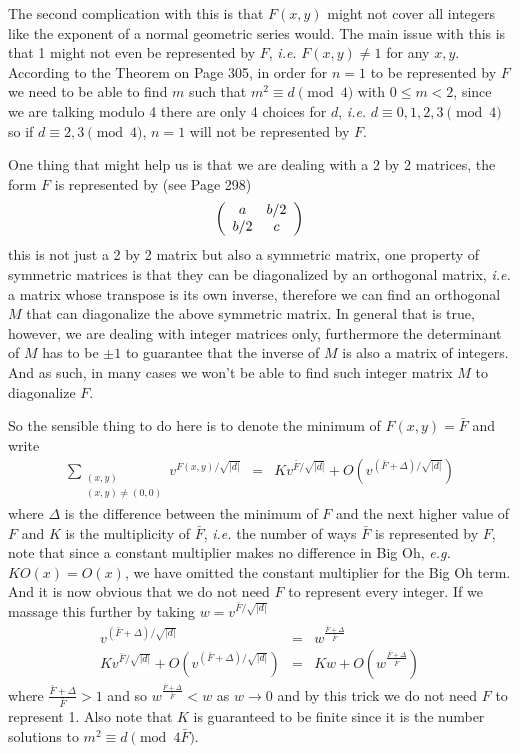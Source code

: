 \documentclass[aps,preprint,preprintnumbers,nofootinbib,showpacs,prd]{revtex4-1}
\newcommand{\ie}{{\it i.e.} }
\newcommand{\eg}{{\it e.g.} }
\newcommand{\nbea}{\begin{eqnarray*}}
\newcommand{\neea}{\end{eqnarray*}}
\begin{document}
The second complication with this is that $F(x,y)$ might not cover all integers like the exponent of a normal geometric series would. The main issue with this is that 1 might not even be represented by $F$, \ie $F(x,y) \neq 1$ for any $x,y$. According to the Theorem on Page 305, in order for $n=1$ to be represented by $F$ we need to be able to find $m$ such that $m^2 \equiv d \pmod{4}$ with $0 \le m < 2$, since we are talking modulo 4 there are only 4 choices for $d$, \ie $d \equiv 0,1,2,3 \pmod{4}$ so if $d \equiv 2,3 \pmod{4}$, $n=1$ will not be represented by $F$.

One thing that might help us is that we are dealing with a 2 by 2 matrices, the form $F$ is represented by (see Page 298)
%
\nbea
\left(
\begin{array}{c c}
a & b/2 \\
b/2 & c
\end{array}
\right)
\neea
%
this is not just a 2 by 2 matrix but also a symmetric matrix, one property of symmetric matrices is that they can be diagonalized by an orthogonal matrix, \ie a matrix whose transpose is its own inverse, therefore we can find an orthogonal $M$ that can diagonalize the above symmetric matrix. In general that is true, however, we are dealing with integer matrices only, furthermore the determinant of $M$ has to be $\pm1$ to guarantee that the inverse of $M$ is also a matrix of integers. And as such, in many cases we won't be able to find such integer matrix $M$ to diagonalize $F$.

So the sensible thing to do here is to denote the minimum of $F(x,y) = \bar F$ and write
%
\nbea
\sum_{\substack{(x,y)\\(x,y)\neq(0,0)}} v^{F(x,y)/\sqrt{|d|}} & = & Kv^{\bar F/\sqrt{|d|}} + O\left(v^{(\bar F + \Delta)/\sqrt{|d|}}\right)
\neea
%
where $\Delta$ is the difference between the minimum of $F$ and the next higher value of $F$ and $K$ is the multiplicity of $\bar F$, \ie the number of ways $\bar F$ is represented by $F$, note that since a constant multiplier makes no difference in Big Oh, \eg $K O(x) = O(x)$, we have omitted the constant multiplier for the Big Oh term. And it is now obvious that we do not need $F$ to represent every integer. If we massage this further by taking $w = v^{\bar F/\sqrt{|d|}}$
%
\nbea
v^{(\bar F+ \Delta)/\sqrt{|d|}} & = & w^{\frac{\bar F + \Delta}{\bar F}} \\
Kv^{\bar F/\sqrt{|d|}} + O\left(v^{(\bar F + \Delta)/\sqrt{|d|}} \right) & = & Kw + O\left(w^{\frac{\bar F + \Delta}{\bar F}}\right)
\neea
%
where $\frac{\bar F + \Delta}{\bar F} > 1$ and so $w^{\frac{\bar F + \Delta}{\bar F}} < w$ as $w\to0$ and by this trick we do not need $F$ to represent 1. Also note that $K$ is guaranteed to be finite since it is the number solutions to $m^2 \equiv d \pmod{4\bar F}$.
\end{document}
